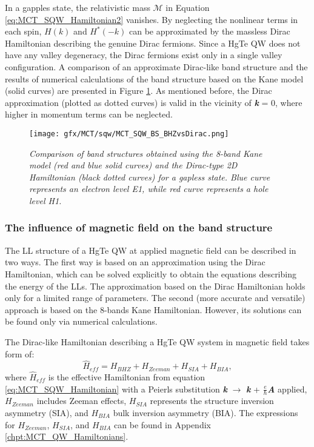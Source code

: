 \documentclass[titlepage,a4paper]{book}
\newcommand{\wciecie}{\quad\phantom{v}}
\begin{document}
In a gapples state, the relativistic mass $\mathcal{M}$ in Equation \ref{eq:MCT_SQW_Hamiltonian2} vanishes. By neglecting the nonlinear terms in each spin, $H(k)$ and $H^*(-k)$ can be approximated by the massless Dirac Hamiltonian describing the genuine Dirac fermions. Since a HgTe QW does not have any valley degeneracy, the Dirac fermions exist only in a single valley configuration. A comparison of an approximate Dirac-like band structure and the results of numerical calculations of the band structure based on the Kane model (solid curves) are presented in Figure \ref{fig:MCT_SQW_BS_BHZvsDirac}. As mentioned before, the Dirac approximation (plotted as dotted curves) is valid in the vicinity of \textbf{\textit{k}} = 0, where higher in momentum terms can be neglected.  

\begin{figure}[H]
	\centering
	\texttt{[image: gfx/MCT/sqw/MCT\_SQW\_BS\_BHZvsDirac.png]}
	\vspace{-10pt}
	\caption{\textit{Comparison of band structures obtained using the 8-band Kane model (red and blue solid curves) and the Dirac-type 2D Hamiltonian (black dotted curves) for a gapless state. Blue curve represents an electron level E1, while red curve represents a hole level H1.}}
	\label{fig:MCT_SQW_BS_BHZvsDirac}
\end{figure} 

\subsubsection{The influence of magnetic field on the band structure}
\wciecie
The LL structure of a HgTe QW at applied magnetic field can be described in two ways. The first way is based on an approximation using the Dirac Hamiltonian, which can be solved explicitly to obtain the equations describing the energy of the LLs. The approximation based on the Dirac Hamiltonian holds only for a limited range of parameters. The second (more accurate and versatile) approach is based on the 8-bands Kane Hamiltonian. However, its solutions can be found only via numerical calculations.

The Dirac-like Hamiltonian describing a HgTe QW system in magnetic field takes form of:
\begin{equation}
\label{eq:MCT_SQW_MagneticField}
\hat H_{eff} = H_{BHZ} + H_{Zeeman} + H_{SIA} + H_{BIA} ,
\end{equation}
where $\hat{H}_{eff}$ is the effective Hamiltonian from equation \ref{eq:MCT_SQW_Hamiltonian} with a Peierls substitution \textbf{\textit{k}} $\rightarrow$ \textbf{\textit{k}} + $\frac{e}{\hbar}$\textbf{\textit{A}} applied, $H_{Zeeman}$ includes Zeeman effects, $H_{SIA}$ represents the structure inversion asymmetry (SIA), and $H_{BIA}$ bulk inversion asymmetry (BIA). The expressions for $H_{Zeeman}$, $H_{SIA}$, and $H_{BIA}$ can be found in Appendix \ref{chpt:MCT_QW_Hamiltonians}.
\end{document}
